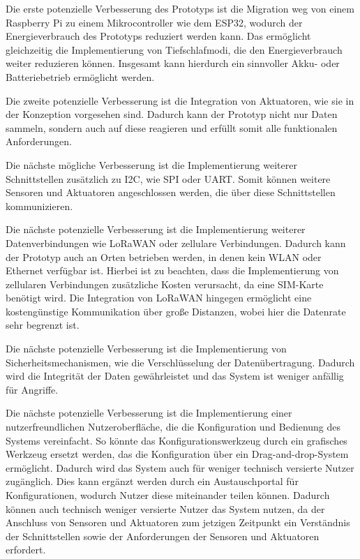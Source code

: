 Die erste potenzielle Verbesserung des Prototyps ist die Migration weg von einem Raspberry Pi zu einem Mikrocontroller wie dem ESP32, wodurch der Energieverbrauch des Prototyps reduziert werden kann.
Das ermöglicht gleichzeitig die Implementierung von Tiefschlafmodi, die den Energieverbrauch weiter reduzieren können.
Insgesamt kann hierdurch ein sinnvoller Akku- oder Batteriebetrieb ermöglicht werden.
\pagebreak

Die zweite potenzielle Verbesserung ist die Integration von Aktuatoren, wie sie in der Konzeption vorgesehen sind.
Dadurch kann der Prototyp nicht nur Daten sammeln, sondern auch auf diese reagieren und erfüllt somit alle funktionalen Anforderungen.

Die nächste mögliche Verbesserung ist die Implementierung weiterer Schnittstellen zusätzlich zu I2C, wie SPI oder UART.
Somit können weitere Sensoren und Aktuatoren angeschlossen werden, die über diese Schnittstellen kommunizieren.

Die nächste potenzielle Verbesserung ist die Implementierung weiterer Datenverbindungen wie LoRaWAN oder zellulare Verbindungen.
Dadurch kann der Prototyp auch an Orten betrieben werden, in denen kein WLAN oder Ethernet verfügbar ist.
Hierbei ist zu beachten, dass die Implementierung von zellularen Verbindungen zusätzliche Kosten verursacht, da eine SIM-Karte benötigt wird.
Die Integration von LoRaWAN hingegen ermöglicht eine kostengünstige Kommunikation über große Distanzen, wobei hier die Datenrate sehr begrenzt ist.

Die nächste potenzielle Verbesserung ist die Implementierung von Sicherheitsmechanismen, wie die Verschlüsselung der Datenübertragung.
Dadurch wird die Integrität der Daten gewährleistet und das System ist weniger anfällig für Angriffe.

Die nächste potenzielle Verbesserung ist die Implementierung einer nutzerfreundlichen Nutzeroberfläche, die die Konfiguration und Bedienung des Systems vereinfacht.
So könnte das Konfigurationswerkzeug durch ein grafisches Werkzeug ersetzt werden, das die Konfiguration über ein Drag-and-drop-System ermöglicht.
Dadurch wird das System auch für weniger technisch versierte Nutzer zugänglich.
Dies kann ergänzt werden durch ein Austauschportal für Konfigurationen, wodurch Nutzer diese miteinander teilen können.
Dadurch können auch technisch weniger versierte Nutzer das System nutzen, da der Anschluss von Sensoren und Aktuatoren zum jetzigen Zeitpunkt ein Verständnis der Schnittstellen sowie der Anforderungen der Sensoren und Aktuatoren erfordert.

